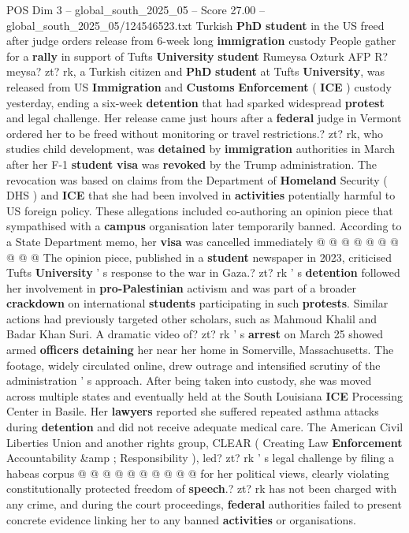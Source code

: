 \begin{textsample}{POS Dim 3 – global\_south\_2025\_05 – Score 27.00 – global\_south\_2025\_05/124546523.txt}  \label{ex:f3_pos_278}
Turkish \textbf{PhD} \textbf{student} in the US freed after judge orders release from 6-week long \textbf{immigration} custody People gather for a \textbf{rally} in support of Tufts \textbf{University} \textbf{student} Rumeysa Ozturk AFP R? meysa? zt? rk, a Turkish citizen and \textbf{PhD} \textbf{student} at Tufts \textbf{University}, was released from US \textbf{Immigration} and \textbf{Customs} \textbf{Enforcement} ( \textbf{ICE} ) custody yesterday, ending a six-week \textbf{detention} that had sparked widespread \textbf{protest} and legal challenge.
Her release came just hours after a \textbf{federal} judge in Vermont ordered her to be freed without monitoring or travel restrictions.? zt? rk, who studies child development, was \textbf{detained} by \textbf{immigration} authorities in March after her F-1 \textbf{student} \textbf{visa} was \textbf{revoked} by the Trump administration.
The revocation was based on claims from the Department of \textbf{Homeland} Security ( DHS ) and \textbf{ICE} that she had been involved in \textbf{activities} potentially harmful to US foreign policy.
These allegations included co-authoring an opinion piece that sympathised with a \textbf{campus} organisation later temporarily banned.
According to a State Department memo, her \textbf{visa} was cancelled immediately @ @ @ @ @ @ @ @ @ @ The opinion piece, published in a \textbf{student} newspaper in 2023, criticised Tufts \textbf{University} ' s response to the war in Gaza.? zt? rk ' s \textbf{detention} followed her involvement in \textbf{pro-Palestinian} activism and was part of a broader \textbf{crackdown} on international \textbf{students} participating in such \textbf{protests}.
Similar actions had previously targeted other scholars, such as Mahmoud Khalil and Badar Khan Suri.
A dramatic video of? zt? rk ' s \textbf{arrest} on March 25 showed armed \textbf{officers} \textbf{detaining} her near her home in Somerville, Massachusetts.
The footage, widely circulated online, drew outrage and intensified scrutiny of the administration ' s approach.
After being taken into custody, she was moved across multiple states and eventually held at the South Louisiana \textbf{ICE} Processing Center in Basile.
Her \textbf{lawyers} reported she suffered repeated asthma attacks during \textbf{detention} and did not receive adequate medical care.
The American Civil Liberties Union and another rights group, CLEAR ( Creating Law \textbf{Enforcement} Accountability \&amp ; Responsibility ), led? zt? rk ' s legal challenge by filing a habeas corpus @ @ @ @ @ @ @ @ @ @ for her political views, clearly violating constitutionally protected freedom of \textbf{speech}.? zt? rk has not been charged with any crime, and during the court proceedings, \textbf{federal} authorities failed to present concrete evidence linking her to any banned \textbf{activities} or organisations.

\end{textsample}
